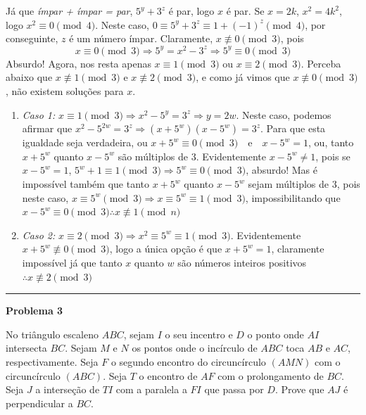 \documentclass{article}
\begin{document}
  Já que \textit{ímpar + ímpar = par}, $5^y + 3^z$ é par, logo $x$ é par. 
  Se $x = 2k$, $x^2 = 4k^2$, logo $x^2 \equiv 0 \pmod{4}$. Neste caso,
  $0 \equiv 5^y + 3^z \equiv 1 + (-1)^z \pmod{4}$, por conseguinte, $z$ é um número
  ímpar. Claramente, $x \not\equiv 0 \pmod{3}$, pois
  \[
    x \equiv 0 \pmod{3} \Rightarrow 5^y = x^2 - 3^z \Rightarrow 5^y \equiv 0 \pmod{3}
  \]
  Absurdo! Agora, nos resta apenas $x \equiv 1 \pmod{3}$ ou $x \equiv 2 \pmod{3}$. Perceba abaixo
  que $x \not\equiv 1 \pmod{3}$ e $x \not\equiv 2 \pmod{3}$, e como já vimos que
  $x \not\equiv 0 \pmod{3}$, não existem soluções para $x$.
  \begin{enumerate}
    \item \textit{Caso 1:} $x \equiv 1 \pmod{3} \Rightarrow x^2 - 5^y = 3^z \Rightarrow y = 2w$. Neste caso, podemos afirmar
      que $x^2 - 5^{2w} = 3^z \Rightarrow (x + 5^w)(x - 5^w) = 3^z$. Para que esta igualdade
      seja verdadeira, ou $x + 5^w \equiv 0 \pmod{3} \quad \text{e} \quad x - 5^w = 1$, ou, tanto
      $x + 5^w$ quanto $x - 5^w$ são múltiplos de 3. Evidentemente $x - 5^w \neq 1$,
      pois se $x - 5^w = 1$, $5^w + 1 \equiv 1 \pmod{3} \Rightarrow 5^w \equiv 0 \pmod{3}$, absurdo!
      Mas é impossível também que tanto $x + 5^w$ quanto $x - 5^w$ sejam múltiplos de 3, pois neste caso,
      $x \equiv 5^w \pmod{3} \Rightarrow  x \equiv 5^w \equiv 1 \pmod{3}$, impossibilitando que
      $x - 5^w \equiv 0 \pmod{3} \therefore x \not\equiv 1 \pmod{n}$
    \item \textit{Caso 2:} $x \equiv 2 \pmod{3} \Rightarrow x^2 \equiv 5^w \equiv 1 \pmod{3}$.
      Evidentemente $x + 5^w \not\equiv 0 \pmod{3}$, logo a única opção é que $x + 5^w = 1$, claramente impossível já
      que tanto $x$ quanto $w$ são números inteiros positivos $\therefore x \not\equiv 2 \pmod{3}$
  \end{enumerate}

  \noindent\rule{\linewidth}{0.4pt}

  {\centering \textbf{Problema 3} \par}

  No triângulo escaleno $ABC$, sejam $I$ o seu incentro e $D$ o
  ponto onde $AI$ intersecta $BC$. Sejam $M$ e $N$ os pontos onde o incírculo de $ABC$
  toca $AB$ e $AC$, respectivamente. Seja $F$ o segundo encontro do circuncírculo $(AMN)$
  com o circuncírculo $(ABC)$. Seja $T$ o encontro de $AF$ com o prolongamento de $BC$.
  Seja $J$ a interseção de $TI$ com a paralela a $FI$ que passa por $D$. Prove que $AJ$ é
  perpendicular a $BC$.
\end{document}
